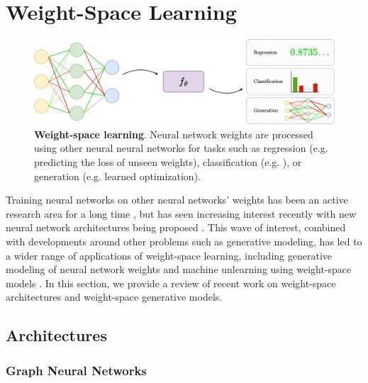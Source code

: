 
\chapter{Weight-Space Learning}\label{section:wsl}

\begin{figure}[h!]
    \centering
    \includegraphics[width=0.8\linewidth]{figures/wsl.drawio.png}
    \caption{\label{fig:wsl} \textbf{Weight-space learning}. Neural network weights are processed using other neural neural networks for tasks such as regression (e.g. predicting the loss of unseen weights), classification (e.g. ), or generation (e.g. learned optimization).}    
\end{figure}

Training neural networks on other neural networks' weights has been an active research area for a long time \citep{haHyperNetworks2016, kruegerBayesianHypernetworks2018}, but has seen increasing interest recently with new neural network architectures being proposed \citep{limGraphMetanetworksProcessing2023,kofinasGraphNeuralNetworks2024,
zhouNeuralFunctionalTransformers2023,zhouUniversalNeuralFunctionals2024}. This wave of interest, combined with developments around other problems such as generative modeling, has led to a wider range of applications of weight-space learning, including generative modeling of neural network weights \citep{peeblesLearningLearnGenerative2022, erkocHyperDiffusionGeneratingImplicit2023} and machine unlearning using weight-space models \citep{rangelLearningForgetUsing2024}. In this section, we provide a review of recent work on weight-space architectures and weight-space generative models. 

\section{Architectures}

\subsection{Graph Neural Networks}

